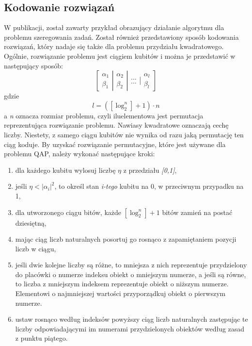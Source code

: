 \subsection{Kodowanie rozwiązań}
W publikacji, został zawarty przykład obrazujący działanie algorytmu dla problemu szeregowania zadań. Został również przedstawiony sposób kodowania rozwiązań, który nadaje się także dla problemu przydziału kwadratowego. Ogólnie, rozwiązanie problemu jest ciągiem kubitów i można je przedstawić w następujący sposób:
\newline
\begin{equation}
\left[ \begin{array}{ccc} \alpha_1 \\ \beta_1 \end{array} \right| \left. \begin{array}{ccc} \alpha_2 \\ \beta_2 \end{array}  \right| \left. \begin{array}{ccc} ... \\ ... \end{array}  \right| \left. \begin{array}{ccc} \alpha_l \\ \beta_l \end{array}  \right]
\end{equation}
\newline
gdzie 
\newline
\begin{equation}
l=([\log_2^n] + 1)\cdot n
\end{equation}
\newline
a \textit{n} oznacza rozmiar problemu, czyli iluelementowa jest permutacja reprezentująca rozwiązanie problemu. Nawiasy kwadratowe oznaczają cechę liczby.
Niestety, z samego ciągu kubitów nie wynika od razu jaką permutację ten ciąg koduje. By uzyskać rozwiązanie permutacyjne, które jest używane dla problemu QAP, należy wykonać następujące kroki:
\begin{enumerate}
\item dla każdego kubitu wylosuj liczbę $\eta$ z przedziału \textit{[0,1]},
\item jeśli $\eta < |\alpha_i|^2$, to określ stan \textit{i-tego} kubitu na 0, w przeciwnym przypadku na 1,
\item dla utworzonego ciągu bitów, każde $[\log_2^n] + 1$ bitów zamień na postać dziesiętną,
\item mając ciąg liczb naturalnych posortuj go rosnąco z zapamiętaniem pozycji liczb w ciągu,
\item jeśli dwie kolejne liczby są różne, to mniejsza z nich reprezentuje przydzielony do placówki o numerze indeksu obiekt o mniejszym numerze, a jeśli są równe, to liczba z mniejszym indeksem reprezentuje obiekt o niższym numerze. Elementowi o najmniejszej wartości przyporządkuj obiekt o pierwszym numerze.
\item ustaw rosnąco według indeksów powyższy ciąg liczb naturalnych zastępując te liczby odpowiadającymi im numerami przydzielonych obiektów według zasad z punktu piątego.
\end{enumerate}
